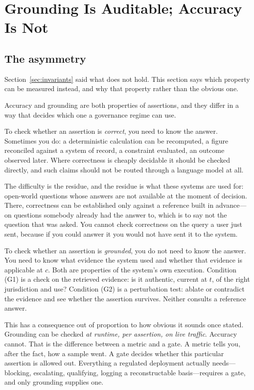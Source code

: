 \section{Grounding Is Auditable; Accuracy Is Not}
\label{ch:auditable}
\label{sec:auditable}

\subsection{The asymmetry}

Section~\ref{sec:invariants} said what does not hold. This section says which property
can be measured instead, and why that property rather than the obvious one.

Accuracy and grounding are both properties of assertions, and they differ in a way
that decides which one a governance regime can use.

To check whether an assertion is \emph{correct}, you need to know the answer.
Sometimes you do: a deterministic
calculation can be recomputed, a figure reconciled against a system of record, a
constraint evaluated, an outcome observed later. Where correctness is cheaply decidable
it should be checked directly, and such claims
should not be routed through a language model at all.

The difficulty is the residue, and the residue is what these systems are used for:
open-world questions whose answers are not available at the moment of decision. There,
correctness can be established only against a reference built in advance---on questions
somebody already had the answer to, which is to say not the question that was asked. You cannot check correctness on the query a user just sent, because
if you could answer it you would not have sent it to the system.

To check whether an assertion is \emph{grounded}, you do not need to know the
answer. You need to know what evidence the system used and whether that evidence
is applicable at $c$. Both are properties of the system's own execution. Condition
(G1) is a check on the retrieved evidence: is it authentic, current at $t$, of
the right jurisdiction and use? Condition (G2) is a perturbation test: ablate or
contradict the evidence and see whether the assertion survives. Neither consults
a reference answer.

This has a consequence out of proportion to how obvious it sounds once stated.
Grounding can be checked \emph{at runtime, per assertion, on live traffic}.
Accuracy cannot. That is the difference between a metric and a gate. A metric
tells you, after the fact, how a sample went. A gate decides whether this
particular assertion is allowed out. Everything a regulated deployment actually
needs---blocking, escalating, qualifying, logging a reconstructable basis---requires
a gate, and only grounding supplies one.

